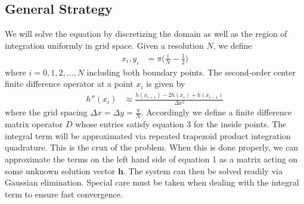 \documentclass[10pt]{article}
\renewcommand{\vec}[1]{\boldsymbol{#1}}
\begin{document}
\subsection*{General Strategy}
We will solve the equation by discretizing the domain as well as the region of integration uniformly in grid space.
Given a resolution $N$, we define
\begin{align}
    x_i, y_i &= \pi \big( \frac{i}{N} - \frac{1}{2} )
\end{align}
where $i = 0,1,2,...,N$ including both boundary points.
The second-order center finite difference operator at a point $x_i$ is given by
\begin{align}
    h''(x_i) &\approx \frac{h(x_{i+1}) - 2h(x_{i}) + h(x_{i-1})}{\Delta x^2}
\end{align}
where the grid spacing $\Delta x = \Delta y = \frac{\pi}{N}$.
Accordingly we define a finite difference matrix operator $D$ whose entries satisfy equation 3 for the inside points.
The integral term will be approximated via repeated trapezoid product integration quadrature.
This is the crux of the problem.
When this is done properly, we can approximate the terms on the left hand side of equation 1 as a matrix acting on some unknown solution vector $\vec{h}$.
The system can then be solved readily via Gaussian elimination.
Special care must be taken when dealing with the integral term to ensure fast convergence.
\end{document}
